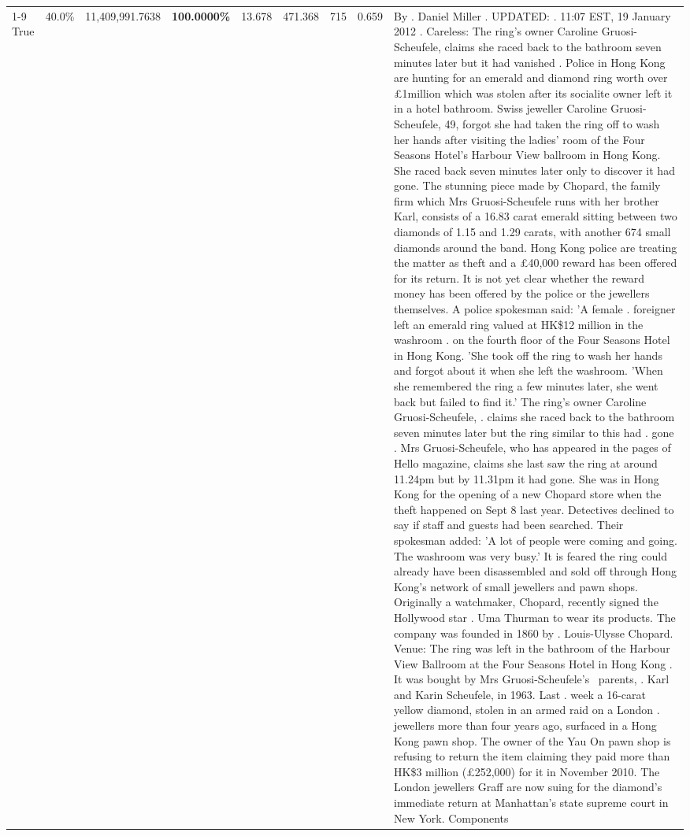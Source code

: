 \begin{table}[H]
\begin{tabular}{lllrlllll}
\cline{1-9}
True & 40.0\% & 11,409,991.7638 & \bfseries \color{red} 100.0000\% & 13.678 & 471.368 & 715 & 0.659 & By . Daniel Miller . UPDATED: . 11:07 EST, 19 January 2012 . Careless: The ring's owner Caroline Gruosi-Scheufele, claims she raced back to the bathroom seven minutes later but it had vanished . Police in Hong Kong are hunting for an emerald and diamond ring worth over £1million which was stolen after its socialite owner left it in a hotel bathroom. Swiss jeweller Caroline Gruosi-Scheufele, 49, forgot she had taken the ring off to wash her hands after visiting the ladies' room of the Four Seasons Hotel's Harbour View ballroom in Hong Kong. She raced back seven minutes later only to discover it had gone. The stunning piece made by Chopard, the family firm which Mrs Gruosi-Scheufele runs with her brother Karl, consists of a 16.83 carat emerald sitting between two diamonds of 1.15 and 1.29 carats, with another 674 small diamonds around the band. Hong Kong police are treating the matter as theft and a £40,000 reward has been offered for its return. It is not yet clear whether the reward money has been offered by the police or the jewellers themselves. A police spokesman said: 'A female . foreigner left an emerald ring valued at HK\$12 million in the washroom . on the fourth floor of the Four Seasons Hotel in Hong Kong. 'She took off the ring to wash her hands and forgot about it when she left the washroom. 'When she remembered the ring a few minutes later, she went back but failed to find it.' The ring's owner Caroline Gruosi-Scheufele, . claims she raced back to the bathroom seven minutes later but the ring similar to this had . gone . Mrs Gruosi-Scheufele, who has appeared in the pages of Hello magazine, claims she last saw the ring at around 11.24pm but by 11.31pm it had gone. She was in Hong Kong for the opening of a new Chopard store when the theft happened on Sept 8 last year. Detectives declined to say if staff and guests had been searched. Their spokesman added: 'A lot of people were coming and going. The washroom was very busy.' It is feared the ring could already have been disassembled and sold off through Hong Kong's network of small jewellers and pawn shops. Originally a watchmaker, Chopard, recently signed the Hollywood star . Uma Thurman to wear its products. The company was founded in 1860 by . Louis-Ulysse Chopard. Venue: The ring was left in the bathroom of the Harbour View Ballroom at the Four Seasons Hotel in Hong Kong . It was bought by Mrs Gruosi-Scheufele's  parents, . Karl and Karin Scheufele, in 1963. Last . week a 16-carat yellow diamond, stolen in an armed raid on a London . jewellers more than four years ago, surfaced in a Hong Kong pawn shop. The owner of the Yau On pawn shop is refusing to return the item claiming they paid more than HK\$3 million (£252,000) for it in November 2010. The London jewellers Graff are now suing for the diamond’s immediate return at Manhattan’s state supreme court in New York. Components \\

\end{tabular}
\end{table}
